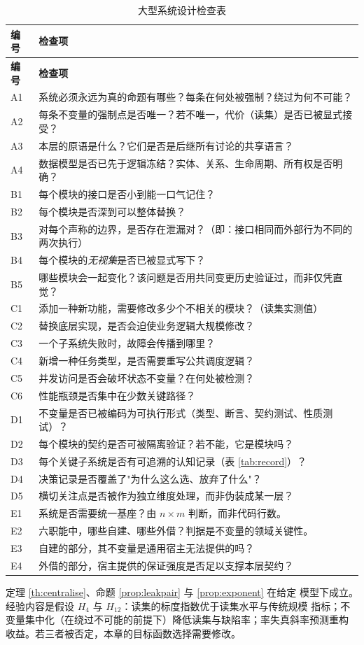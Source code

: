 \begin{longtable}{L{1.0cm}L{13.4cm}}
\caption{大型系统设计检查表}\label{tab:checklist}\\
\toprule
\textbf{编号} & \textbf{检查项} \\
\midrule
\endfirsthead
\toprule
\textbf{编号} & \textbf{检查项} \\
\midrule
\endhead
\bottomrule
\endlastfoot
A1 & 系统必须永远为真的命题有哪些？每条在何处被强制？绕过为何不可能？\\
A2 & 每条不变量的强制点是否唯一？若不唯一，代价（读集）是否已被显式接受？\\
A3 & 本层的原语是什么？它们是否是后继所有讨论的共享语言？\\
A4 & 数据模型是否已先于逻辑冻结？实体、关系、生命周期、所有权是否明确？\\
\midrule
B1 & 每个模块的接口是否小到能一口气记住？\\
B2 & 每个模块是否深到可以整体替换？\\
B3 & 对每个声称的边界，是否存在泄漏对？（即：接口相同而外部行为不同的两次执行）\\
B4 & 每个模块的\emph{无视集}是否已被显式写下？\\
B5 & 哪些模块会一起变化？该问题是否用共同变更历史验证过，而非仅凭直觉？\\
\midrule
C1 & 添加一种新功能，需要修改多少个不相关的模块？（读集实测值）\\
C2 & 替换底层实现，是否会迫使业务逻辑大规模修改？\\
C3 & 一个子系统失败时，故障会传播到哪里？\\
C4 & 新增一种任务类型，是否需要重写公共调度逻辑？\\
C5 & 并发访问是否会破坏状态不变量？在何处被检测？\\
C6 & 性能瓶颈是否集中在少数关键路径？\\
\midrule
D1 & 不变量是否已被编码为可执行形式（类型、断言、契约测试、性质测试）？\\
D2 & 每个模块的契约是否可被隔离验证？若不能，它是模块吗？\\
D3 & 每个关键子系统是否有可追溯的认知记录（表 \ref{tab:record}）？\\
D4 & 决策记录是否覆盖了"为什么这么选、放弃了什么"？\\
D5 & 横切关注点是否被作为独立维度处理，而非伪装成某一层？\\
\midrule
E1 & 系统是否需要统一基座？由 $n \times m$ 判断，而非代码行数。\\
E2 & 六职能中，哪些自建、哪些外借？判据是不变量的领域关键性。\\
E3 & 自建的部分，其不变量是通用宿主无法提供的吗？\\
E4 & 外借的部分，宿主提供的保证强度是否足以支撑本层契约？\\
\bottomrule
\end{longtable}

定理 \ref{th:centralise}、命题 \ref{prop:leakpair} 与 \ref{prop:exponent} 在给定
模型下成立。经验内容是假设 $H_4$ 与 $H_{12}$：读集的标度指数优于读集水平与传统规模
指标；不变量集中化（在绕过不可能的前提下）降低读集与缺陷率；率失真斜率预测重构
收益。若三者被否定，本章的目标函数选择需要修改。
